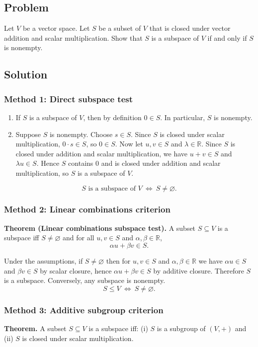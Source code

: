 \documentclass[12pt]{article}
\begin{document}
\subsection{Problem}
Let $V$ be a vector space. Let $S$ be a subset of $V$ that is closed under vector addition and scalar multiplication. Show that $S$ is a subspace of $V$ if and only if $S$ is nonempty.

\subsection{Solution}

\subsubsection{Method 1: Direct subspace test}
\begin{enumerate}[label=(\roman*)]
\item[$(\Rightarrow)$] If $S$ is a subspace of $V$, then by definition $0\in S$. In particular, $S$ is nonempty.
\item[$(\Leftarrow)$] Suppose $S$ is nonempty. Choose $s\in S$. Since $S$ is closed under scalar multiplication, $0\cdot s\in S$, so $0\in S$.
Now let $u,v\in S$ and $\lambda\in\mathbb{R}$. Since $S$ is closed under addition and scalar multiplication, we have $u+v\in S$ and $\lambda u\in S$. Hence $S$ contains $0$ and is closed under addition and scalar multiplication, so $S$ is a subspace of $V$.
\end{enumerate}
\[
\boxed{\,S\text{ is a subspace of }V\ \Longleftrightarrow\ S\neq\varnothing.\,}
\]

\subsubsection{Method 2: Linear combinations criterion}
\textbf{Theorem (Linear combinations subspace test).}
A subset $S\subseteq V$ is a subspace iff $S\neq\varnothing$ and for all $u,v\in S$ and $\alpha,\beta\in\mathbb{R}$,
\[
\alpha u+\beta v\in S.
\]

Under the assumptions, if $S\neq\varnothing$ then for $u,v\in S$ and $\alpha,\beta\in\mathbb{R}$ we have $\alpha u\in S$ and $\beta v\in S$ by scalar closure, hence $\alpha u+\beta v\in S$ by additive closure. Therefore $S$ is a subspace.
Conversely, any subspace is nonempty.
\[
\boxed{\,S\le V\ \Longleftrightarrow\ S\neq\varnothing.\,}
\]

\subsubsection{Method 3: Additive subgroup criterion}
\textbf{Theorem.} A subset $S\subseteq V$ is a subspace iff:
(i) $S$ is a subgroup of $(V,+)$ and
(ii) $S$ is closed under scalar multiplication.
\end{document}
